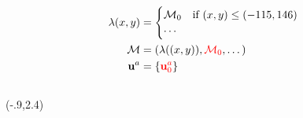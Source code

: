 \documentclass{beamer}
\begin{document}
\begin{frame}
\begin{columns}
\begin{column}{0.7\textwidth}
\begin{equation*}
\begin{split}
        \lambda(x,y)&=\begin{cases}
          \mathcal{M}_0   &\text{if } (x,y) \leq (-115,146)\\
          \cdots
        \end{cases}\\
        \mathcal{M}&=\left(\lambda((x,y)),{\color{red}\mathcal{M}_0},\dots\right)\\
        \mathbf{u}^a&=\{{\color{red}\mathbf{u}_0^a}\}
      \end{split}\end{equation*}
      \end{column}
    \end{columns}
\end{frame}


\begin{frame}
  \footnotesize
    \begin{columns}
      \begin{column}{0.3\textwidth}     
        \begin{textblock}{5}(-.9,2.4)
            \only<1>{\begin{figure}\end{figure}}
            \vspace*{-5ex}
          \end{textblock}
      \end{column}
      \begin{column}{0.7\textwidth}

\end{column}
\end{columns}
\end{frame}
\end{document}
